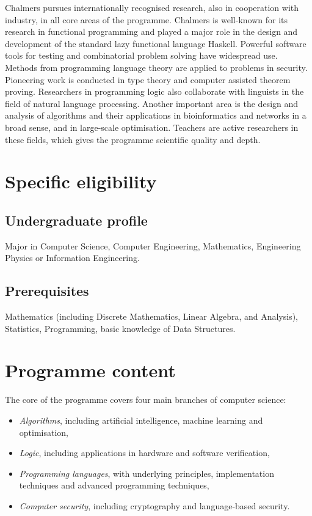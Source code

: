 \documentclass[twocolumn]{article}
\begin{document}
Chalmers pursues internationally recognised research,
also in cooperation with industry, in all core areas of the
programme. Chalmers is well-known for its research in functional
programming and played a major role in the design and development of
the standard lazy functional language Haskell. Powerful software tools
for testing and combinatorial problem solving have widespread
use. Methods from programming language theory are applied to problems
in security. Pioneering work is conducted in type theory and computer
assisted theorem proving. Researchers in programming logic also
collaborate with linguists in the field of natural language
processing. Another important area is the design and analysis of
algorithms and their applications in bioinformatics and networks in a
broad sense, and in large-scale optimisation.  Teachers are active
researchers in these fields, which gives the programme scientific
quality and depth.

\section{Specific eligibility}
\subsection{Undergraduate profile}

Major in Computer Science, Computer Engineering, Mathematics,
Engineering Physics or Information Engineering.
 
\subsection{Prerequisites}

Mathematics (including Discrete Mathematics, Linear Algebra, and
Analysis), Statistics, Programming, basic knowledge of Data
Structures.

\section{Programme content}
 
The core of the programme covers four main branches of computer science:
\begin{itemize}
\item {\em Algorithms}, including artificial intelligence, machine
  learning and optimisation,
\item {\em Logic}, including applications in hardware and software
  verification,
\item {\em Programming languages}, with underlying principles,
  implementation techniques and advanced programming techniques,
\item {\em Computer security}, including cryptography and
  language-based security.
\end{itemize}
\end{document}
